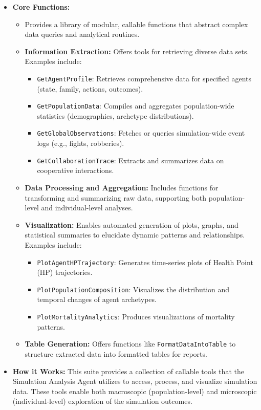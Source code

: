 \begin{itemize}
    \item \textbf{Core Functions:}
    \begin{itemize}
        \item Provides a library of modular, callable functions that abstract complex data queries and analytical routines.
        \item \textbf{Information Extraction:} Offers tools for retrieving diverse data sets. Examples include:
        \begin{itemize}
            \item \texttt{GetAgentProfile}: Retrieves comprehensive data for specified agents (state, family, actions, outcomes).
            \item \texttt{GetPopulationData}: Compiles and aggregates population-wide statistics (demographics, archetype distributions).
            \item \texttt{GetGlobalObservations}: Fetches or queries simulation-wide event logs (e.g., fights, robberies).
            \item \texttt{GetCollaborationTrace}: Extracts and summarizes data on cooperative interactions.
        \end{itemize}
        \item \textbf{Data Processing and Aggregation:} Includes functions for transforming and summarizing raw data, supporting both population-level and individual-level analyses.
        \item \textbf{Visualization:} Enables automated generation of plots, graphs, and statistical summaries to elucidate dynamic patterns and relationships. Examples include:
        \begin{itemize}
            \item \texttt{PlotAgentHPTrajectory}: Generates time-series plots of Health Point (HP) trajectories.
            \item \texttt{PlotPopulationComposition}: Visualizes the distribution and temporal changes of agent archetypes.
            \item \texttt{PlotMortalityAnalytics}: Produces visualizations of mortality patterns.
        \end{itemize}
        \item \textbf{Table Generation:} Offers functions like \texttt{FormatDataIntoTable} to structure extracted data into formatted tables for reports.
    \end{itemize}
    \item \textbf{How it Works:}
    This suite provides a collection of callable tools that the Simulation Analysis Agent utilizes to access, process, and visualize simulation data. These tools enable both macroscopic (population-level) and microscopic (individual-level) exploration of the simulation outcomes.
\end{itemize}

